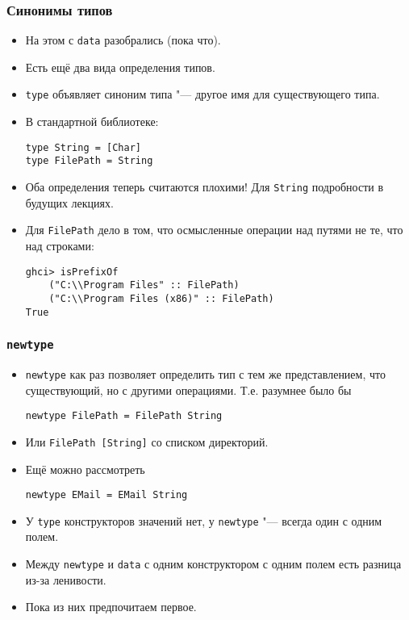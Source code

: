 \documentclass[10pt]{beamer}
\begin{document}
\begin{frame}[fragile]
  \frametitle{Синонимы типов}
  \begin{itemize}
    \item На этом с \lstinline|data| разобрались (пока что).
          \pause
    \item Есть ещё два вида определения типов.
    \item \lstinline|type| объявляет синоним типа "--- другое имя для существующего типа.
    \item В стандартной библиотеке:
          \begin{lstlisting}
type String = [Char]
type FilePath = String
\end{lstlisting}
    \item Оба определения теперь считаются плохими! Для \lstinline|String| подробности в будущих лекциях.
          \pause
    \item Для \lstinline|FilePath| дело в том, что осмысленные операции над путями не те, что над строками:
          \begin{lstlisting}
ghci> isPrefixOf 
    ("C:\\Program Files" :: FilePath) 
    ("C:\\Program Files (x86)" :: FilePath)
True
\end{lstlisting}
  \end{itemize}
\end{frame}

\begin{frame}[fragile]
  \frametitle{\lstinline|newtype|}
  \begin{itemize}
    \item \lstinline|newtype| как раз позволяет определить тип с тем же представлением, что существующий, но с другими операциями. Т.е. разумнее было бы
          \begin{lstlisting}
newtype FilePath = FilePath String
\end{lstlisting}
    \item Или \lstinline|FilePath [String]| со списком директорий.
    \item Ещё можно рассмотреть
          \begin{lstlisting}
newtype EMail = EMail String
\end{lstlisting}
    \item У \lstinline|type| конструкторов значений нет, у \lstinline|newtype| "--- всегда один с одним полем.
    \item Между \lstinline|newtype| и \lstinline|data| с одним конструктором с одним полем есть разница из-за ленивости.
    \item Пока из них предпочитаем первое.
  \end{itemize}
\end{frame}
\end{document}
